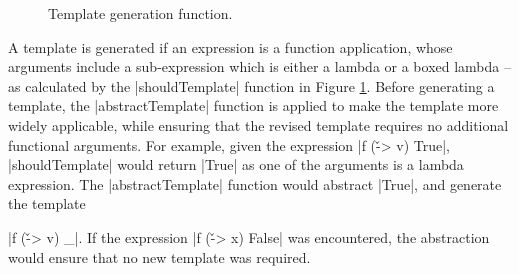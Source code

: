 \begin{figure}
\begin{comment}
\begin{code}
underscore = undefined :: Expr
\end{code}
\end{comment}
\caption{Template generation function.}
\label{figF:template_generation}
\end{figure}

A template is generated if an expression is a function application, whose arguments include a sub-expression which is either a lambda or a boxed lambda -- as calculated by the |shouldTemplate| function in Figure \ref{figF:template_generation}. Before generating a template, the |abstractTemplate| function is applied to make the template more widely applicable, while ensuring that the revised template requires no additional functional arguments. For example, given the expression |f (\v -> v) True|, |shouldTemplate| would return |True| as one of the arguments is a lambda expression. The |abstractTemplate| function would abstract |True|, and generate the template \ignore|f (\v -> v) _|. If the expression |f (\v -> x) False| was encountered, the abstraction would ensure that no new template was required.

